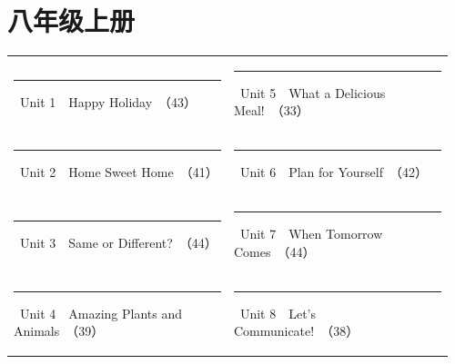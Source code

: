 \documentclass[UTF8,a4paper,11pt,oneside]{ctexbook}
\begin{document}
\chapter{八年级上册}
\par\noindent{\color{volcolor}\rule{\linewidth}{2.6pt}}\par
\vspace{0.3em}
\par
\vspace{1.0em}
\par
\vspace{0.35em}
\noindent\begin{tabular}{@{}p{0.48\linewidth}p{0.48\linewidth}@{}}
{\color{volcolor}\rule[0.3ex]{0.85ex}{0.85ex}}~Unit 1　Happy Holiday~{\footnotesize\color{textgray!80}（43）} & {\color{volcolor}\rule[0.3ex]{0.85ex}{0.85ex}}~Unit 5　What a Delicious Meal!~{\footnotesize\color{textgray!80}（33）} \\
{\color{volcolor}\rule[0.3ex]{0.85ex}{0.85ex}}~Unit 2　Home Sweet Home~{\footnotesize\color{textgray!80}（41）} & {\color{volcolor}\rule[0.3ex]{0.85ex}{0.85ex}}~Unit 6　Plan for Yourself~{\footnotesize\color{textgray!80}（42）} \\
{\color{volcolor}\rule[0.3ex]{0.85ex}{0.85ex}}~Unit 3　Same or Different?~{\footnotesize\color{textgray!80}（44）} & {\color{volcolor}\rule[0.3ex]{0.85ex}{0.85ex}}~Unit 7　When Tomorrow Comes~{\footnotesize\color{textgray!80}（44）} \\
{\color{volcolor}\rule[0.3ex]{0.85ex}{0.85ex}}~Unit 4　Amazing Plants and Animals~{\footnotesize\color{textgray!80}（39）} & {\color{volcolor}\rule[0.3ex]{0.85ex}{0.85ex}}~Unit 8　Let's Communicate!~{\footnotesize\color{textgray!80}（38）} \\
\end{tabular}
\vspace{1.3em}
\end{document}
